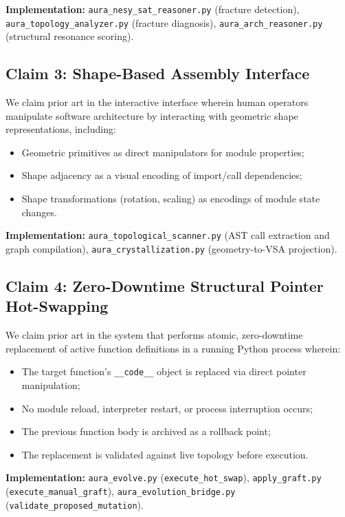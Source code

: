 \documentclass[11pt]{article}
\begin{document}
\textbf{Implementation:} \texttt{aura\_nesy\_sat\_reasoner.py} (fracture detection), \texttt{aura\_topology\_analyzer.py} (fracture diagnosis), \texttt{aura\_arch\_reasoner.py} (structural resonance scoring).

\subsection{Claim 3: Shape-Based Assembly Interface}

We claim prior art in the interactive interface wherein human operators manipulate software architecture by interacting with geometric shape representations, including:
\begin{itemize}
    \item Geometric primitives as direct manipulators for module properties;
    \item Shape adjacency as a visual encoding of import/call dependencies;
    \item Shape transformations (rotation, scaling) as encodings of module state changes.
\end{itemize}

\textbf{Implementation:} \texttt{aura\_topological\_scanner.py} (AST call extraction and graph compilation), \texttt{aura\_crystallization.py} (geometry-to-VSA projection).

\subsection{Claim 4: Zero-Downtime Structural Pointer Hot-Swapping}

We claim prior art in the system that performs atomic, zero-downtime replacement of active function definitions in a running Python process wherein:
\begin{itemize}
    \item The target function's \texttt{\_\_code\_\_} object is replaced via direct pointer manipulation;
    \item No module reload, interpreter restart, or process interruption occurs;
    \item The previous function body is archived as a rollback point;
    \item The replacement is validated against live topology before execution.
\end{itemize}

\textbf{Implementation:} \texttt{aura\_evolve.py} (\texttt{execute\_hot\_swap}), \texttt{apply\_graft.py} (\texttt{execute\_manual\_graft}), \texttt{aura\_evolution\_bridge.py} (\texttt{validate\_proposed\_mutation}).
\end{document}

